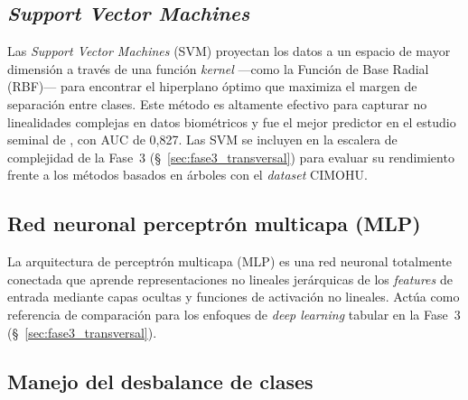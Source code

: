 \documentclass[../tesis.tex]{subfiles}
\begin{document}
\subsection{\textit{Support Vector Machines}}
\label{subsec:svm}

Las \textit{Support Vector Machines} (SVM) proyectan los datos a un espacio de mayor dimensión
a través de una función \textit{kernel} ---como la Función de Base Radial (RBF)--- para encontrar
el hiperplano óptimo que maximiza el margen de separación entre clases.
Este método es altamente efectivo para capturar no linealidades complejas en datos biométricos y
fue el mejor predictor en el estudio seminal de \textcite{Yoo2013}, con AUC de 0{,}827.
Las SVM se incluyen en la escalera de complejidad de la Fase~3 (§~\ref{sec:fase3_transversal})
para evaluar su rendimiento frente a los métodos basados en árboles con el \textit{dataset} CIMOHU.

\subsection{Red neuronal perceptrón multicapa (MLP)}
\label{subsec:mlp}

La arquitectura de perceptrón multicapa (MLP) es una red neuronal totalmente conectada que aprende
representaciones no lineales jerárquicas de los \textit{features} de entrada mediante capas ocultas
y funciones de activación no lineales.
Actúa como referencia de comparación para los enfoques de \textit{deep learning} tabular en la
Fase~3 (§~\ref{sec:fase3_transversal}).

\subsection{Manejo del desbalance de clases}
\label{subsec:smote}
\end{document}
